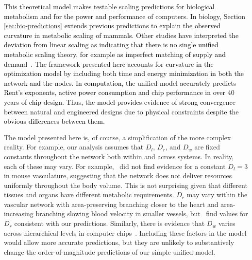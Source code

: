\documentclass[12pt]{article}
\newcommand{\red}[1]{\textcolor{black}{#1}}
\begin{document}
\red{This theoretical model makes testable scaling predictions for biological metabolism and for the power and performance of computers.  In biology, Section
\ref{sec:bio-predictions} extends previous predictions to explain the
observed curvature in metabolic scaling of mammals.  \red{Other studies have interpreted the
deviation from linear scaling as indicating that there is no single unified metabolic scaling theory, for example as imperfect matching of supply and demand~\cite{banavar2002supply}. The
framework presented here accounts for curvature in the optimization model by including both time and energy minimization in both the network and the nodes.} In computation, the unified model accurately predicts Rent's exponents, active power consumption and chip performance in over 40 years of chip design.
Thus,
the model provides evidence of strong convergence between natural and
engineered designs due to physical constraints despite the obvious
differences between them.} 

The model presented here is, of course, a simplification of the more
complex reality. For example, our analysis assumes that $D_l$, $D_r$,
and $D_w$ are fixed constants throughout the network both within and
across systems. In reality, each of these may vary.  For
example,~\cite{newberry2015testing} did not find evidence for a
constant $D_l = 3$ in mouse vasculature, suggesting that the network
does not deliver resources uniformly throughout the body volume. This
is not surprising given that different tissues and organs have
different metabolic requirements. $D_r$ may vary
within the vascular network with area-preserving branching closer to the heart and area-increasing branching slowing blood velocity in smaller
vessels, but~\cite{newberry2015testing} find values for $D_r$
consistent with our predictions.  Similarly, there is evidence that
$D_w$ varies across hierarchical levels in computer
chips~\cite{ozaktas2004information}. Including these factors in the
model would allow more accurate predictions, but they are unlikely to
substantively change the order-of-magnitude predictions of 
our simple unified model.
\end{document}
